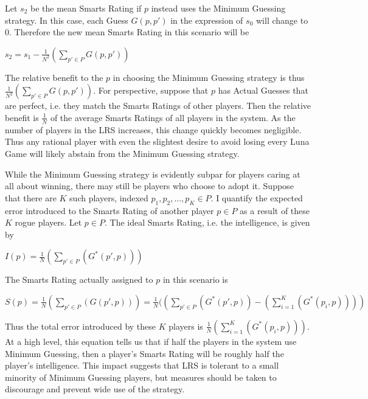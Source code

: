 \noindent Let $s_2$ be the mean Smarts Rating if $p$ instead uses the Minimum Guessing strategy. In this case, each Guess $G(p, p')$ in the expression of $s_0$ will change to $0$. Therefore the new mean Smarts Rating in this scenario will be 
\begin{center}
\begin{math}
s_2 = s_1 - \frac{1}{N^2}(\sum_{p' \in P} G(p, p'))
\end{math}
\end{center}
The relative benefit to the $p$ in choosing the Minimum Guessing strategy is thus \\
$\frac{1}{N^2}(\sum_{p' \in P} G(p, p'))$. For perspective, suppose that $p$ has Actual Guesses that are perfect, i.e. they match the Smarts Ratings of other players. Then the relative benefit is $\frac{1}{N}$ of the average Smarts Ratings of all players in the system.  As the number of players in the LRS increases, this change quickly becomes negligible. Thus any rational player with even the slightest desire to avoid losing every Luna Game will likely abstain from the Minimum Guessing strategy.

While the Minimum Guessing strategy is evidently subpar for players caring at all about winning, there may still be players who choose to adopt it. Suppose that there are $K$ such players, indexed $p_1, p_2, ..., p_K \in P$. I quantify the expected error introduced to the Smarts Rating of another player $p \in P$ as a result of these $K$ rogue players. Let $p \in P$. The ideal Smarts Rating, i.e. the intelligence, is given by
\begin{center}
\begin{math}
I(p) = \frac{1}{N}(\sum_{p' \in P}(G^*(p', p)))
\end{math}
\end{center}
The Smarts Rating actually assigned to $p$ in this scenario is
\begin{center}
\begin{math}
S(p) = \frac{1}{N}(\sum_{p' \in P}(G(p', p))) = \frac{1}{N}((\sum_{p' \in P}(G^*(p', p)) - (\sum_{i=1}^K(G^*(p_i, p))))
\end{math}
\end{center}
Thus the total error introduced by these $K$ players is $\frac{1}{N}(\sum_{i=1}^K(G^*(p_i, p)))$. At a high level, this equation tells us that if half the players in the system use Minimum Guessing, then a player's Smarts Rating will be roughly half the player's intelligence. This impact suggests that LRS is tolerant to a small minority of Minimum Guessing players, but measures should be taken to discourage and prevent wide use of the strategy.

